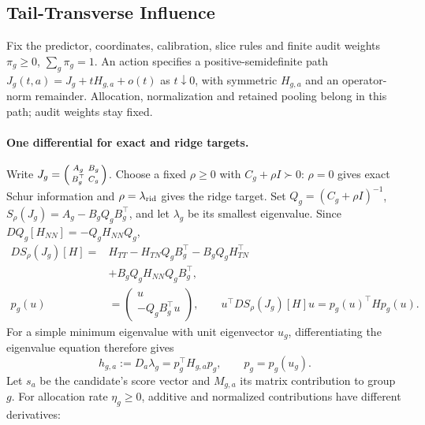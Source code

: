 \subsection{Tail-Transverse Influence}
\label{app:tail-transverse-influence}
\label{sec:targeted-interventions}

Fix the predictor, coordinates, calibration, slice rules and finite audit weights $\pi_g\ge0$, $\sum_g\pi_g=1$. An action specifies a positive-semidefinite path $J_g(t,a)=J_g+tH_{g,a}+o(t)$ as $t\downarrow0$, with symmetric $H_{g,a}$ and an operator-norm remainder. Allocation, normalization and retained pooling belong in this path; audit weights stay fixed.

\paragraph{One differential for exact and ridge targets.}
Write $J_g=\begin{psmallmatrix}A_g&B_g\\B_g^\top&C_g\end{psmallmatrix}$. Choose a fixed $\rho\ge0$ with $C_g+\rho I\succ0$: $\rho=0$ gives exact Schur information and $\rho=\lambda_{\mathrm{rid}}$ gives the ridge target. Set $Q_g=(C_g+\rho I)^{-1}$, $S_\rho(J_g)=A_g-B_gQ_gB_g^\top$, and let $\lambda_g$ be its smallest eigenvalue. Since $DQ_g[H_{NN}]=-Q_gH_{NN}Q_g$,
\begin{equation}
\begin{aligned}
DS_\rho(J_g)[H]={}&H_{TT}-H_{TN}Q_gB_g^\top-B_gQ_gH_{TN}^\top\\
&+B_gQ_gH_{NN}Q_gB_g^\top,\\
p_g(u)&=\begin{pmatrix}u\\-Q_gB_g^\top u\end{pmatrix},
\qquad u^\top DS_\rho(J_g)[H]u=p_g(u)^\top Hp_g(u).
\end{aligned}
\label{eq:influence-schur-differential}
\end{equation}
For a simple minimum eigenvalue with unit eigenvector $u_g$, differentiating the eigenvalue equation therefore gives
\begin{equation}
h_{g,a}:=D_a\lambda_g=p_g^\top H_{g,a}p_g,
\qquad p_g=p_g(u_g).
\label{eq:directional-schur-derivative}
\end{equation}
Let $s_a$ be the candidate's score vector and $M_{g,a}$ its matrix contribution to group $g$. For allocation rate $\eta_g\ge0$, additive and normalized contributions have different derivatives:
